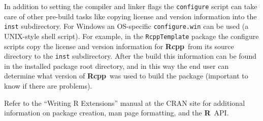 \documentclass{article}
\newcommand{\R}{{\bf R}}
\newcommand{\Rcpp}{{\bf Rcpp}}
\begin{document}
In addition to setting the compiler and linker flags the {\tt configure}
script can take care of other pre-build tasks like copying license
and version information into the {\tt inst} subdirectory. For Windows
an OS-specific {\tt configure.win} can be used (a UNIX-style shell script).
For example, in the {\tt RcppTemplate} package the configure scripts
copy the license and version information for \Rcpp\ from its source
directory to the {\tt inst} subdirectory. After the build this information
can be found in the installed package root directory, and in this way
the end user can determine what version of \Rcpp\ was used to build
the package (important to know if there are problems).

Refer to the ``Writing R Extensions'' manual at the CRAN site for additional
information on package creation, man page formatting, and the \R\ API.
\end{document}
